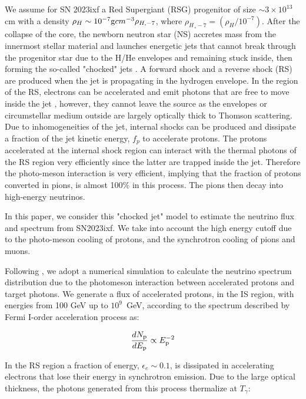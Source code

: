 \documentclass[twocolumn]{aastex631}
\begin{document}
We assume for SN 2023ixf a Red Supergiant (RSG) progenitor of size $\sim 3 \times 10^{13}$ cm \citep{Kilpatrick2023,Jencson2023,Hosseinzadeh2023} with a density $\rho_H\sim 10^{-7} {\rm g}{cm}^{-3} \rho_{H,-7}$, where $\rho_{H¸-7}=\left(\rho_H/10^{-7}\right)$\citep{Meszaros2001Jet,He2018,Guetta2020,Fasano2021}. After the collapse of the core, the newborn neutron star (NS) accretes mass from the innermost stellar material and launches energetic jets that cannot break through the progenitor star due to the H/He envelopes and remaining stuck inside, then forming the so-called "chocked" jets \citep{Piran2019,Meszaros2001Jet, Macfadyen2001}. A forward shock and a reverse shock (RS) are produced when the jet is propagating in the hydrogen envelope. In the region of the RS, electrons can be accelerated and emit photons that are free to move inside the jet \citep{Senno2016}, however, they cannot leave the source as the envelopes or circumstellar medium outside are largely optically thick to Thomson scattering. Due to inhomogeneities of the jet, internal shocks can be produced and  dissipate a fraction of the jet kinetic energy, $f_p$ to accelerate protons.
The protons accelerated at the internal shock region can interact with the thermal photons of the RS region very efficiently since the latter are trapped inside the jet. Therefore the photo-meson interaction is very efficient, implying that the fraction of protons converted in pions, is almost 100$\%$ in this process. The pions then decay into high-energy neutrinos. 

In this paper, we consider this "chocked jet" model \citep{Senno2016,He2018,Fasano2021} to estimate the neutrino flux and spectrum  from SN2023ixf. We take into account the high energy cutoff due to the photo-meson cooling of protons, and the synchrotron cooling of pions and muons.

Following \citep{He2018,Fasano2021}, we adopt a numerical simulation to calculate the neutrino spectrum distribution due to the photomeson interaction between accelerated protons and target photons. We generate a flux of accelerated protons, in the IS region, with energies from 100 GeV up to $10^{9}$~GeV, according to the spectrum described by Fermi I-order acceleration process as:

\begin{equation}
    \frac{dN_{\rm p}}{dE_{\rm p}} \propto E_{\rm p}^{-2}
\end{equation}

In the RS region a fraction of energy, $\epsilon_e\sim0.1$, is dissipated in accelerating electrons that lose their energy in synchrotron emission. Due to the large optical thickness, the photons generated from this process thermalize at $T_{\gamma}$:
\end{document}
